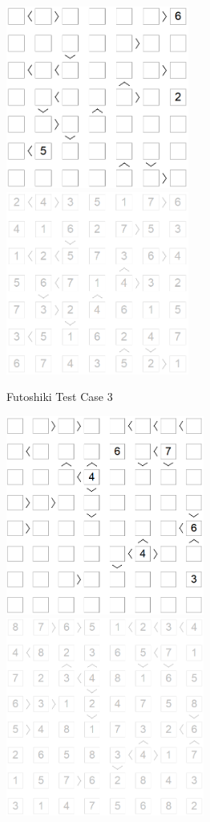 \documentclass{article}
\begin{document}
\begin{enumerate}
\begin{figure}[htbp]
    \label{fig:case22}
  \end{figure}
        \begin{figure}[htbp]
    \centering
    \includegraphics[width=6cm]{Pic/f3}
    \qquad
    \includegraphics[width=6cm]{Pic/f3s}
    \caption{Futoshiki Test Case 3}
    \label{fig:case33}
  \end{figure}
        \begin{figure}[htbp]
    \centering
    \includegraphics[width=6.5cm]{Pic/f4}
    \qquad
    \includegraphics[width=6.5cm]{Pic/f4s}

\end{figure}
\end{enumerate}
\end{document}
